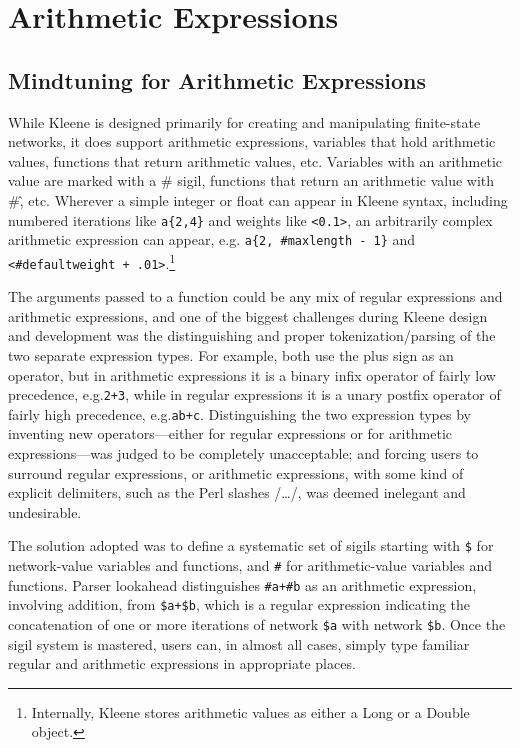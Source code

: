 \documentclass[letterpaper,12pt]{article}
\newcommand{\Kleene}{Kleene\xspace}
\begin{document}
\section{Arithmetic Expressions}

\subsection{Mindtuning for Arithmetic Expressions}

While \Kleene{} is designed primarily for creating and manipulating
finite-state networks, it does support arithmetic expressions, variables
that hold arithmetic values, functions that return arithmetic values,
etc.  Variables with an arithmetic value are marked with a \# sigil,
functions that return an arithmetic value with \#\^, etc.  Wherever a
simple integer or float can appear in \Kleene{} syntax, including
numbered iterations like \verb!a{2,4}! and weights like \verb!<0.1>!, an
arbitrarily complex arithmetic expression can appear, e.g.\@ 
\verb!a{2, #maxlength - 1}! and \verb!<#defaultweight + .01>!.\footnote{Internally,
\Kleene{} stores arithmetic values as either a Long or a Double object.}

The arguments passed to a function could be any mix of regular
expressions and arithmetic expressions, and one of the biggest challenges
during \Kleene{} design and development was the distinguishing and proper
tokenization/parsing of the two separate expression types.  For example,
both use the plus sign as an operator, but in arithmetic expressions it
is a binary infix operator of fairly low precedence, e.g.\@  \verb!2+3!,
while in regular expressions it is a unary postfix operator of fairly
high precedence, e.g.\@ \verb!ab+c!.  Distinguishing the two
expression types by inventing new operators---either for regular
expressions or for arithmetic expressions---was judged to be
completely unacceptable; and forcing users to surround regular
expressions, or arithmetic expressions, with some kind of explicit
delimiters, such as the Perl slashes /\ldots/, was deemed inelegant
and undesirable.

The solution adopted was to define a systematic set of sigils starting
with \verb!$! for network-value variables and functions, and \verb!#! for
arithmetic-value variables and functions.  Parser lookahead distinguishes
\verb!#a+#b! as an arithmetic expression, involving addition, from
\verb!$a+$b!, which is a regular expression indicating the concatenation
of one or more iterations of network \verb!$a! with network \verb!$b!.
Once the sigil system is mastered, users can, in almost all cases, simply
type familiar regular and arithmetic expressions in appropriate places. 
\end{document}

